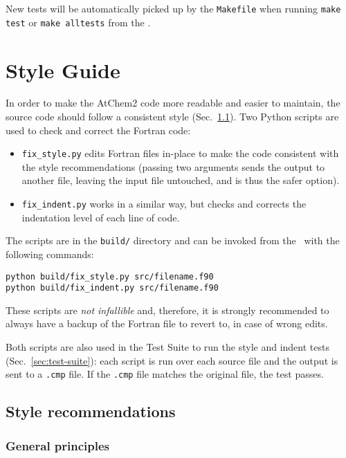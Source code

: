 New tests will be automatically picked up by the \texttt{Makefile}
when running \verb|make test| or \verb|make alltests| from the
\maindir.

\section{Style Guide} \label{sec:style-guide}

In order to make the AtChem2 code more readable and easier to
maintain, the source code should follow a consistent style
(Sec.~\ref{subsec:style-recommendations}). Two Python scripts are used
to check and correct the Fortran code:

\begin{itemize}
\item \texttt{fix\_style.py} edits Fortran files in-place to make the
  code consistent with the style recommendations (passing two
  arguments sends the output to another file, leaving the input file
  untouched, and is thus the safer option).
\item \texttt{fix\_indent.py} works in a similar way, but checks and
  corrects the indentation level of each line of code.
\end{itemize}

The scripts are in the \texttt{build/} directory and can be invoked
from the \maindir\ with the following commands:

\begin{verbatim}
python build/fix_style.py src/filename.f90
python build/fix_indent.py src/filename.f90
\end{verbatim}

These scripts are \emph{not infallible} and, therefore, it is strongly
recommended to always have a backup of the Fortran file to revert to,
in case of wrong edits.

Both scripts are also used in the Test Suite to run the style and
indent tests (Sec.~\ref{sec:test-suite}): each script is run over each
source file and the output is sent to a \texttt{.cmp} file. If the
\texttt{.cmp} file matches the original file, the test passes.

\subsection{Style recommendations} \label{subsec:style-recommendations}

\subsubsection{General principles}

